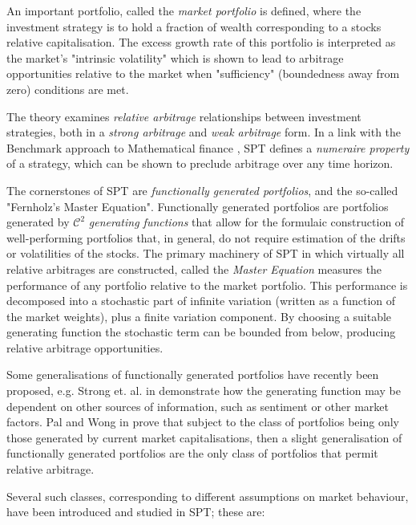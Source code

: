 \documentclass[british]{amsart} \usepackage{lmodern}
\numberwithin{equation}{section} \numberwithin{figure}{section}
\theoremstyle{plain} \newtheorem{thm}{\protect\theoremname}[section]
\theoremstyle{definition} \newtheorem{defn}[thm]{\protect\definitionname}
\theoremstyle{plain} \newtheorem{assumption}[thm]{\protect\assumptionname}
\theoremstyle{plain} \newtheorem{lem}[thm]{\protect\lemmaname}
\theoremstyle{plain} \newtheorem{prop}[thm]{\protect\propositionname}
\theoremstyle{remark} \newtheorem{rem}[thm]{\protect\remarkname}
\theoremstyle{plain} \newtheorem{cor}[thm]{\protect\corollaryname}
\begin{document}
An important portfolio, called the \textit{market portfolio} is defined, where
the investment strategy is to hold a fraction of wealth corresponding to a
stocks relative capitalisation. The excess growth rate of this portfolio is
interpreted as the market's "intrinsic volatility" which is shown to lead to
arbitrage opportunities relative to the market when "sufficiency" (boundedness
away from zero) conditions are met.

The theory examines \textit{relative arbitrage} relationships between investment
strategies, both in a \textit{strong arbitrage} and \textit{weak arbitrage}
form. In a link with the Benchmark approach to Mathematical finance
\cite{platen2006}, SPT defines a \textit{numeraire property} of a strategy,
which can be shown to preclude arbitrage over any time horizon.

The cornerstones of SPT are \textit{functionally generated portfolios}, and the
so-called "Fernholz's Master Equation". Functionally generated portfolios are
portfolios generated by $\mathcal{C}^2$ \textit{generating functions} that allow
for the formulaic construction of well-performing portfolios that, in general,
do not require estimation of the drifts or volatilities of the stocks. The
primary machinery of SPT in which virtually all relative arbitrages are
constructed, called the \textit{Master Equation} measures the performance of any
portfolio relative to the market portfolio. This performance is decomposed into
a stochastic part of infinite variation (written as a function of the market
weights), plus a finite variation component. By choosing a suitable generating
function the stochastic term can be bounded from below, producing relative
arbitrage opportunities.

Some generalisations of functionally generated portfolios have recently been
proposed, e.g. Strong et. al. in \cite{strong2014generalizations} demonstrate
how the generating function may be dependent on other sources of information,
such as sentiment or other market factors. Pal and Wong in \cite{pal2013} prove
that subject to the class of portfolios being only those generated by current
market capitalisations, then a slight generalisation of functionally generated
portfolios are the only class of portfolios that permit relative arbitrage.

Several such classes, corresponding to different assumptions on market
behaviour, have been introduced and studied in SPT; these are:
\end{document}
